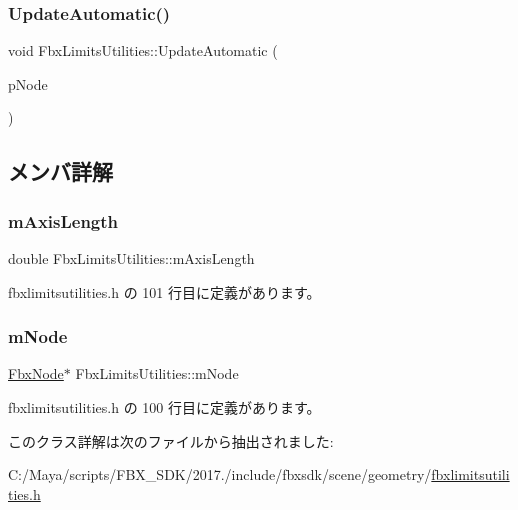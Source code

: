 \mbox{\label{class_fbx_limits_utilities_a7f562d759a98f601f8bbb23727506c39}} 
\subsubsection{\texorpdfstring{Update\+Automatic()}{UpdateAutomatic()}}
{\footnotesize\ttfamily void Fbx\+Limits\+Utilities\+::\+Update\+Automatic (\begin{DoxyParamCaption}\item[{\hyperlink{class_fbx_node}{Fbx\+Node} $\ast$}]{p\+Node }\end{DoxyParamCaption})}



\subsection{メンバ詳解}
\mbox{\label{class_fbx_limits_utilities_adb006b0fb0202573d3401021d860a66f}} 
\subsubsection{\texorpdfstring{m\+Axis\+Length}{mAxisLength}}
{\footnotesize\ttfamily double Fbx\+Limits\+Utilities\+::m\+Axis\+Length}



 fbxlimitsutilities.\+h の 101 行目に定義があります。

\mbox{\label{class_fbx_limits_utilities_aa0edad5da0f8d55bf0ada0b8268d7b17}} 
\subsubsection{\texorpdfstring{m\+Node}{mNode}}
{\footnotesize\ttfamily \hyperlink{class_fbx_node}{Fbx\+Node}$\ast$ Fbx\+Limits\+Utilities\+::m\+Node}



 fbxlimitsutilities.\+h の 100 行目に定義があります。



このクラス詳解は次のファイルから抽出されました\+:\begin{DoxyCompactItemize}
\item 
C\+:/\+Maya/scripts/\+F\+B\+X\+\_\+\+S\+D\+K/2017./include/fbxsdk/scene/geometry/\hyperlink{fbxlimitsutilities_8h}{fbxlimitsutilities.\+h}\end{DoxyCompactItemize}
